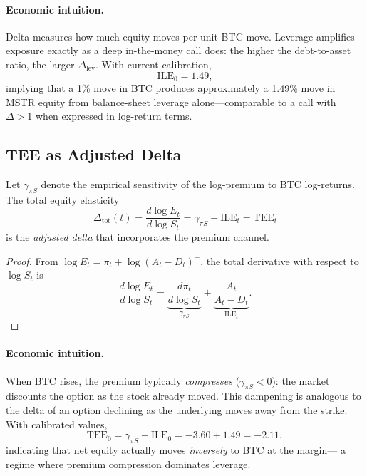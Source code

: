 \paragraph{Economic intuition.}
Delta measures how much equity moves per unit BTC move.  Leverage amplifies
exposure exactly as a deep in-the-money call does: the higher the
debt-to-asset ratio, the larger $\Delta_{\mathrm{lev}}$.  With current
calibration,
$$
  \mathrm{ILE}_0 = 1.49,
$$
implying that a 1\% move in BTC produces approximately a 1.49\% move in
MSTR equity from balance-sheet leverage alone---comparable to a call with
$\Delta > 1$ when expressed in log-return terms.

\subsection{TEE as Adjusted Delta}\label{ssec:tee-adj-delta}

\begin{proposition}\label{prop:tee-delta}
Let $\gamma_{\pi S}$ denote the empirical sensitivity of the log-premium to
BTC log-returns.  The total equity elasticity
$$
  \Delta_{\mathrm{tot}}(t)
  = \frac{d\log E_t}{d\log S_t}
  = \gamma_{\pi S} + \mathrm{ILE}_t
  = \mathrm{TEE}_t
$$
is the \emph{adjusted delta} that incorporates the premium channel.
\end{proposition}

\begin{proof}
From $\log E_t = \pi_t + \log(A_t - D_t)^+$, the total derivative with respect
to $\log S_t$ is
$$
  \frac{d\log E_t}{d\log S_t}
  = \underbrace{\frac{d\pi_t}{d\log S_t}}_{\gamma_{\pi S}}
  + \underbrace{\frac{A_t}{A_t - D_t}}_{\mathrm{ILE}_t}.
$$
\end{proof}

\paragraph{Economic intuition.}
When BTC rises, the premium typically \emph{compresses} ($\gamma_{\pi S} < 0$):
the market discounts the option as the stock already moved.  This dampening
is analogous to the delta of an option declining as the underlying moves away
from the strike.  With calibrated values,
$$
  \mathrm{TEE}_0 = \gamma_{\pi S} + \mathrm{ILE}_0
  = -3.60 + 1.49 = -2.11,
$$
indicating that net equity actually moves \emph{inversely} to BTC at the margin---
a regime where premium compression dominates leverage.

